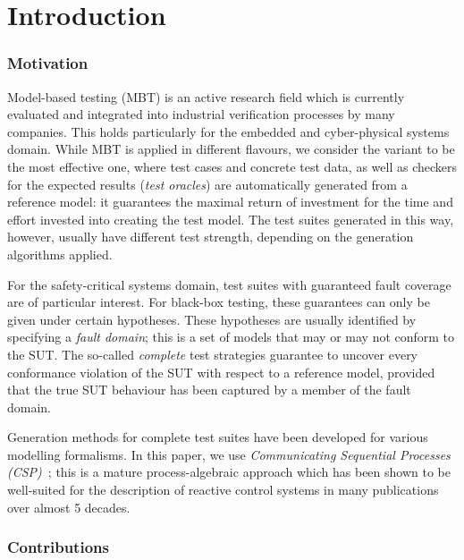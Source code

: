 \section{Introduction}
\label{sec:intro}


\subsubsection*{Motivation}

Model-based testing (MBT) is an  active research field which  is currently evaluated and integrated into industrial verification  
processes by many companies. This holds particularly for the embedded and cyber-physical systems domain. While MBT is applied in different flavours, we consider the variant 
to be the most effective one, 
where test cases and concrete test data, as well as checkers for the expected results
(\emph{test oracles})
 are automatically generated from a reference model:
 it guarantees the maximal return of investment for the time and effort invested into creating the test model. The test suites generated in 
 this way, however, usually have different test strength, 
 depending on the generation algorithms applied.
 
For the safety-critical systems domain, test suites with guaranteed fault coverage 
are of particular interest. For black-box testing, these guarantees can only be given 
under certain hypotheses. These hypotheses are usually identified by specifying a \emph{fault domain}; this is a set of models that may or may not conform to the SUT. 
The so-called \emph{complete} test strategies guarantee to uncover every conformance violation of the SUT with respect to a reference model, provided that the true SUT behaviour has been captured by a member of the fault domain. 

Generation methods for complete test suites have been developed for various modelling formalisms. In this paper, we use 
\emph{Communicating Sequential Processes (CSP)}~\cite{Hoare:1985:CSP:3921,Roscoe2010}; 
this is 
a mature process-algebraic approach  which has been shown to be well-suited for 
the description of reactive control systems in many publications over almost 5 decades.

\subsubsection*{Contributions}



